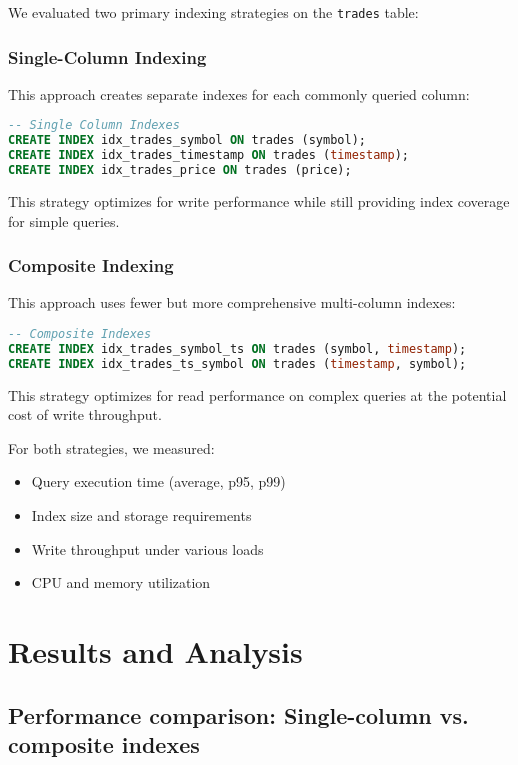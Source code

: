 \documentclass[11pt,a4paper]{article}
\begin{document}
We evaluated two primary indexing strategies on the \texttt{trades} table:

\subsubsection{Single-Column Indexing}

This approach creates separate indexes for each commonly queried column:

\begin{lstlisting}[language=SQL]
-- Single Column Indexes
CREATE INDEX idx_trades_symbol ON trades (symbol);
CREATE INDEX idx_trades_timestamp ON trades (timestamp);
CREATE INDEX idx_trades_price ON trades (price);
\end{lstlisting}

This strategy optimizes for write performance while still providing index coverage for simple queries.

\subsubsection{Composite Indexing}

This approach uses fewer but more comprehensive multi-column indexes:

\begin{lstlisting}[language=SQL]
-- Composite Indexes
CREATE INDEX idx_trades_symbol_ts ON trades (symbol, timestamp);
CREATE INDEX idx_trades_ts_symbol ON trades (timestamp, symbol);
\end{lstlisting}

This strategy optimizes for read performance on complex queries at the potential cost of write throughput.

For both strategies, we measured:
\begin{itemize}
    \item Query execution time (average, p95, p99)
    \item Index size and storage requirements
    \item Write throughput under various loads
    \item CPU and memory utilization
\end{itemize}

\section{Results and Analysis}

\subsection{Performance comparison: Single-column vs. composite indexes}
\end{document}
